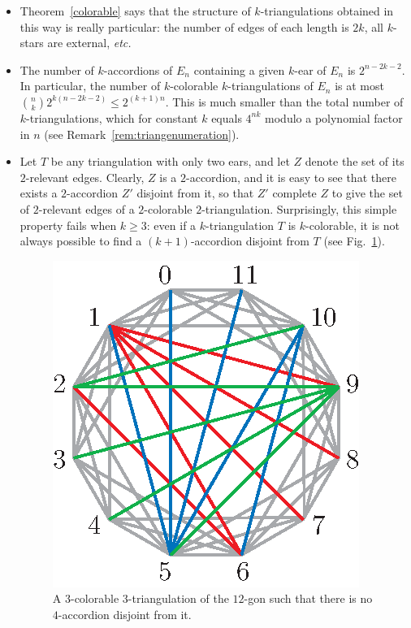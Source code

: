 \documentclass[12pt]{amsart}
\begin{document}
\begin{itemize}
\item Theorem~\ref{colorable} says that the structure of $k$-triangulations obtained in this way is really particular: the number of edges of each length is $2k$, all $k$-stars are external, {\it etc.}
\item The number of $k$-accordions of $E_n$ containing a given $k$-ear of $E_n$ is $2^{n-2k-2}$. In particular, the number of $k$-colorable $k$-triangulations of $E_n$ is at most ${n \choose k}2^{k(n-2k-2)}\le 2^{(k+1)n}$. This is much smaller than the total number of $k$-triangulations, which for constant $k$ equals $4^{nk}$ modulo a polynomial factor in $n$ (see Remark~\ref{rem:triangenumeration}).

\item Let $T$ be any triangulation with only two ears, and let $Z$ denote the set of its $2$-relevant edges. Clearly, $Z$ is a $2$-accordion, and it is easy to see that there exists a $2$-accordion $Z'$ disjoint from it, so that $Z'$ complete $Z$ to give the set of $2$-relevant edges of a $2$-colorable $2$-triangulation. Surprisingly, this simple property fails when $k\ge3$: even if a $k$-triangulation $T$ is $k$-colorable, it is not always possible to find a $(k+1)$-accordion disjoint from $T$ (see Fig.~\ref{ctrexm}).

\begin{figure}
\centerline{\includegraphics[scale=1]{ctrexm.eps}}
\caption{\small{A $3$-colorable $3$-triangulation of the $12$-gon such that there is no $4$-accordion disjoint from it.}}\label{ctrexm}
\end{figure}
\end{itemize}
\end{document}
